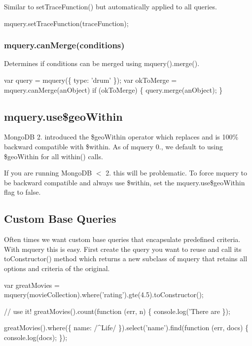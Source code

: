 Similar to {\ttfamily set\+Trace\+Function()} but automatically applied to all queries.


\begin{DoxyCode}
mquery.setTraceFunction(traceFunction);
\end{DoxyCode}


\subsubsection*{mquery.\+can\+Merge(conditions)}

Determines if {\ttfamily conditions} can be merged using {\ttfamily mquery().merge()}.


\begin{DoxyCode}
var query = mquery(\{ type: 'drum' \});
var okToMerge = mquery.canMerge(anObject)
if (okToMerge) \{
  query.merge(anObject);
\}
\end{DoxyCode}


\subsection*{mquery.\+use\$geo\+Within}

Mongo\+DB 2. introduced the {\ttfamily \$geo\+Within} operator which replaces and is 100\% backward compatible with {\ttfamily \$within}. As of mquery 0., we default to using {\ttfamily \$geo\+Within} for all {\ttfamily within()} calls.

If you are running Mongo\+DB $<$ 2. this will be problematic. To force {\ttfamily mquery} to be backward compatible and always use {\ttfamily \$within}, set the {\ttfamily mquery.\+use\$geo\+Within} flag to {\ttfamily false}.




\subsection*{Custom Base Queries}

Often times we want custom base queries that encapsulate predefined criteria. With {\ttfamily mquery} this is easy. First create the query you want to reuse and call its {\ttfamily to\+Constructor()} method which returns a new subclass of {\ttfamily mquery} that retains all options and criteria of the original.


\begin{DoxyCode}
var greatMovies = mquery(movieCollection).where('rating').gte(4.5).toConstructor();

// use it!
greatMovies().count(function (err, n) \{
  console.log('There are %
\});

greatMovies().where(\{ name: /^Life/ \}).select('name').find(function (err, docs) \{
  console.log(docs);
\});
\end{DoxyCode}


